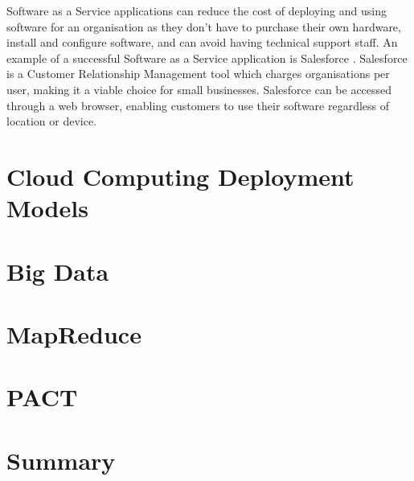 Software as a Service applications can reduce the cost of deploying and using software for an organisation as they don't have to purchase their own hardware, install and configure software, and can avoid having technical support staff. An example of a successful Software as a Service application is Salesforce \cite{salesforce}. Salesforce is a Customer Relationship Management tool which charges organisations per user, making it a viable choice for small businesses. Salesforce can be accessed through a web browser, enabling customers to use their software regardless of location or device. 

\section{Cloud Computing Deployment Models}

\section{Big Data}

\section{MapReduce}

\section{PACT}

\section{Summary}